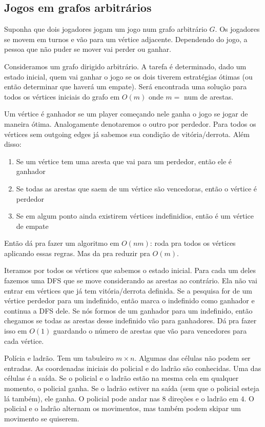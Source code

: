 \subsection{Jogos em grafos arbitrários}

Suponha que dois jogadores jogam um jogo num grafo arbitrário $G$. Os jogadores se movem em turnos e vão para um vértice adjacente. Dependendo do jogo, a pessoa que não puder se mover vai perder ou ganhar.

Consideramos um grafo dirigido arbitrário. A tarefa é determinado, dado um estado inicial, quem vai ganhar o jogo se os dois tiverem estratégias ótimas (ou então determinar que haverá um empate). Será encontrada uma solução para todos os vértices iniciais do grafo em $O(m)$ onde $m=$ num de arestas.

Um vértice é ganhador se um player começando nele ganha o jogo se jogar de maneira ótima. Analogamente denotaremos o outro por perdedor. Para todos os vértices sem outgoing edges já sabemos sua condição de vitória/derrota. Além disso:

\begin{enumerate}
    \item Se um vértice tem uma aresta que vai para um perdedor, então ele é ganhador
    \item Se todas as arestas que saem de um vértice são vencedoras, então o vértice é perdedor
    \item Se em algum ponto ainda existirem vértices indefinidios, então é um vértice de empate
\end{enumerate}

Então dá pra fazer um algoritmo em $O(nm)$: roda pra todos os vértices aplicando essas regras. Mas da pra reduzir pra $O(m)$.

Iteramos por todos os vértices que sabemos o estado inicial. Para cada um deles fazemos uma DFS que se move considerando as arestas ao contrário. Ela não vai entrar em vértices que já tem vitória/derrota definida. Se a pesquisa for de um vértice perdedor para um indefinido, então marca o indefinido como ganhador e continua a DFS dele. Se nós formos de um ganhador para um indefinido, então chegamos se todas as arestas desse indefinido vão para ganhadores. Dá pra fazer isso em $O(1)$ guardando o número de arestas que vão para vencedores para cada vértice.


 Polícia e ladrão. Tem um tabuleiro $m \times n$. Algumas das células não podem ser entradas. As coordenadas iniciais do policial e do ladrão são conhecidas. Uma das células é a saída. Se o policial e o ladrão estão na mesma cela em qualquer momento, o policial ganha. Se o ladrão estiver na saída (sem que o policial esteja lá também), ele ganha. O policial pode andar nas $8$ direções e o ladrão em $4$. O policial e o ladrão alternam os movimentos, mas também podem skipar um movimento se quiserem.

